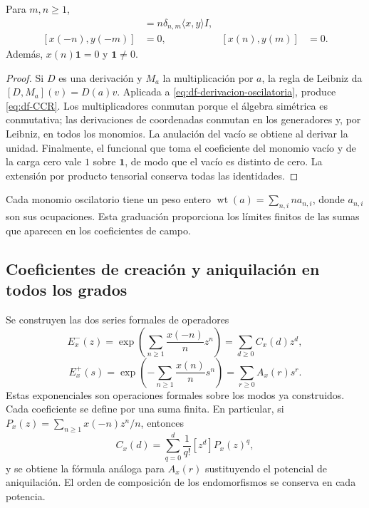 \begin{theorem}
\label{thm:df-heisenberg}
Para \(m,n\geq1\),
\begin{align}
 [x(n),y(-m)]&=n\delta_{n,m}\langle x,y\rangle I,
 \label{eq:df-CCR}\\
 [x(-n),y(-m)]&=0,
 & [x(n),y(m)]&=0.
\end{align}
Además, \(x(n)\mathbf1=0\) y \(\mathbf1\ne0\).
\end{theorem}

\begin{proof}
Si \(D\) es una derivación y \(M_a\) la multiplicación por \(a\), la
regla de Leibniz da \([D,M_a](v)=D(a)v\). Aplicada a
\eqref{eq:df-derivacion-oscilatoria}, produce \eqref{eq:df-CCR}.
Los multiplicadores conmutan porque el álgebra simétrica es conmutativa;
las derivaciones de coordenadas conmutan en los generadores y, por
Leibniz, en todos los monomios. La anulación del vacío se obtiene al
derivar la unidad. Finalmente, el funcional que toma el coeficiente del
monomio vacío y de la carga cero vale \(1\) sobre \(\mathbf1\), de modo
que el vacío es distinto de cero. La extensión por producto tensorial
conserva todas las identidades.
\end{proof}

Cada monomio oscilatorio tiene un peso entero
\(\operatorname{wt}(a)=\sum_{n,i}n a_{n,i}\), donde
\(a_{n,i}\) son sus ocupaciones. Esta graduación proporciona los límites
finitos de las sumas que aparecen en los coeficientes de campo.

\subsection{Coeficientes de creación y aniquilación en todos los grados}
\label{subsec:df-exponenciales}


Se construyen las dos series formales de operadores
\begin{equation}
 E^-_x(z)=\exp\!\left(\sum_{n\geq1}\frac{x(-n)}n z^n\right)
         =\sum_{d\geq0}C_x(d)z^d,
 \label{eq:df-creacion}
\end{equation}
\begin{equation}
 E^+_x(s)=\exp\!\left(-\sum_{n\geq1}\frac{x(n)}n s^n\right)
         =\sum_{r\geq0}A_x(r)s^r.
 \label{eq:df-aniquilacion}
\end{equation}
Estas exponenciales son operaciones formales sobre los modos ya
construidos. Cada coeficiente se define por una suma finita. En particular,
si \(P_x(z)=\sum_{n\geq1}x(-n)z^n/n\), entonces
\begin{equation}
 C_x(d)=\sum_{q=0}^{d}\frac1{q!}[z^d]P_x(z)^q,
 \label{eq:df-coeficiente-creacion}
\end{equation}
y se obtiene la fórmula análoga para \(A_x(r)\) sustituyendo el potencial
de aniquilación. El orden de composición de los endomorfismos se conserva
en cada potencia.

